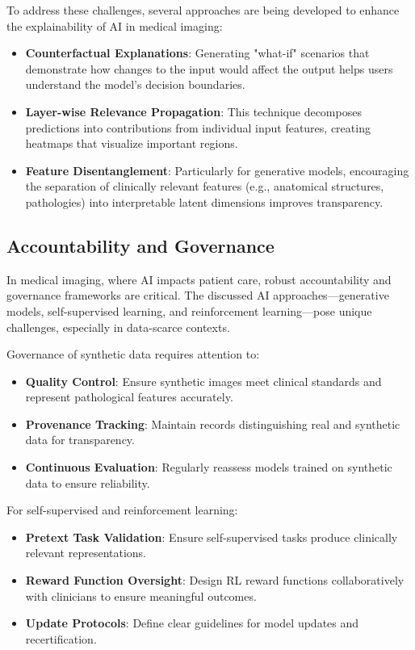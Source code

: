 \documentclass{article}
\begin{document}
To address these challenges, several approaches are being developed to enhance the explainability of AI in medical imaging:

\begin{itemize}
    
    \item \textbf{Counterfactual Explanations}: Generating "what-if" scenarios that demonstrate how changes to the input would affect the output helps users understand the model's decision boundaries.
    
    \item \textbf{Layer-wise Relevance Propagation}: This technique decomposes predictions into contributions from individual input features, creating heatmaps that visualize important regions.
    
    \item \textbf{Feature Disentanglement}: Particularly for generative models, encouraging the separation of clinically relevant features (e.g., anatomical structures, pathologies) into interpretable latent dimensions improves transparency.
\end{itemize}


\subsection{Accountability and Governance}
In medical imaging, where AI impacts patient care, robust accountability and governance frameworks are critical. The discussed AI approaches—generative models, self-supervised learning, and reinforcement learning—pose unique challenges, especially in data-scarce contexts.

Governance of synthetic data requires attention to:

\begin{itemize}
    \item \textbf{Quality Control}: Ensure synthetic images meet clinical standards and represent pathological features accurately.
    \item \textbf{Provenance Tracking}: Maintain records distinguishing real and synthetic data for transparency.
    \item \textbf{Continuous Evaluation}: Regularly reassess models trained on synthetic data to ensure reliability.
\end{itemize}

For self-supervised and reinforcement learning:

\begin{itemize}
    \item \textbf{Pretext Task Validation}: Ensure self-supervised tasks produce clinically relevant representations.
    \item \textbf{Reward Function Oversight}: Design RL reward functions collaboratively with clinicians to ensure meaningful outcomes.
    \item \textbf{Update Protocols}: Define clear guidelines for model updates and recertification.
\end{itemize}
\end{document}
